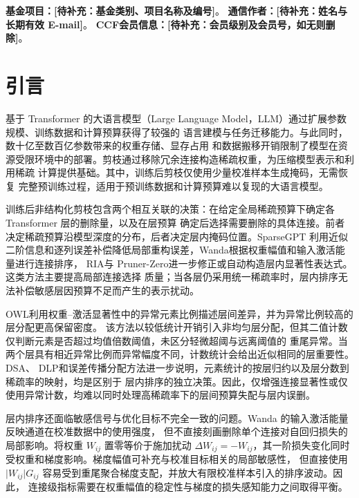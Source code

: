 \documentclass[UTF8,fontset=fandol]{ctexart}
\newcommand{\placeholder}[1]{\textbf{[待补充：#1]}}
\begin{document}
\vspace{6pt}
\noindent{}
\textbf{基金项目：}\placeholder{基金类别、项目名称及编号}。\quad
\textbf{通信作者：}\placeholder{姓名与长期有效 E-mail}。\quad
\textbf{CCF会员信息：}\placeholder{会员级别及会员号，如无则删除}。
\vspace{4pt}
\endgroup
\vspace{8pt}

\section{引言}

基于 Transformer 的大语言模型（Large Language Model，LLM）通过扩展参数规模、训练数据和计算预算获得了较强的
语言建模与任务迁移能力\cite{llama,llama2,transformer}。与此同时，数十亿至数百亿参数带来的权重存储、显存占用
和数据搬移开销限制了模型在资源受限环境中的部署。剪枝通过移除冗余连接构造稀疏权重，为压缩模型表示和利用稀疏
计算提供基础\cite{obd,obs,han2015,deepcompression}。其中，训练后剪枝仅使用少量校准样本生成掩码，无需恢复
完整预训练过程，适用于预训练数据和计算预算难以复现的大语言模型。

训练后非结构化剪枝包含两个相互关联的决策：在给定全局稀疏预算下确定各 Transformer 层的删除量，以及在层预算
确定后选择需要删除的具体连接。前者决定稀疏预算沿模型深度的分布，后者决定层内掩码位置。SparseGPT\cite{sparsegpt}
利用近似二阶信息和逐列误差补偿降低局部重构误差，Wanda\cite{wanda}根据权重幅值和输入激活能量进行连接排序，
RIA\cite{ria}与 Pruner-Zero\cite{prunerzero}进一步修正或自动构造层内显著性表达式。这类方法主要提高局部连接选择
质量；当各层仍采用统一稀疏率时，层内排序无法补偿敏感层因预算不足而产生的表示扰动。

OWL\cite{owl}利用权重--激活显著性中的异常元素比例描述层间差异，并为异常比例较高的层分配更高保留密度。
该方法以较低统计开销引入非均匀层分配，但其二值计数仅判断元素是否超过均值倍数阈值，未区分轻微超阈与远离阈值的
重尾异常。当两个层具有相近异常比例而异常幅度不同，计数统计会给出近似相同的层重要性。DSA\cite{dsa}、
DLP\cite{dlp}和误差传播分配方法\cite{atp}进一步说明，元素统计的按层归约以及层分数到稀疏率的映射，均是区别于
层内排序的独立决策。因此，仅增强连接显著性或仅使用异常计数，均难以同时处理高稀疏率下的层间预算失配与层内误删。

层内排序还面临敏感信号与优化目标不完全一致的问题。Wanda 的输入激活能量反映通道在校准数据中的使用强度，
但不直接刻画删除单个连接对自回归损失的局部影响。将权重 $W_{ij}$ 置零等价于施加扰动
$\Delta W_{ij}=-W_{ij}$，其一阶损失变化同时受权重和梯度影响。梯度幅值可补充与校准目标相关的局部敏感性，
但直接使用 $\lvert W_{ij}\rvert G_{ij}$ 容易受到重尾聚合梯度支配，并放大有限校准样本引入的排序波动。因此，
连接级指标需要在权重幅值的稳定性与梯度的损失感知能力之间取得平衡。
\end{document}
